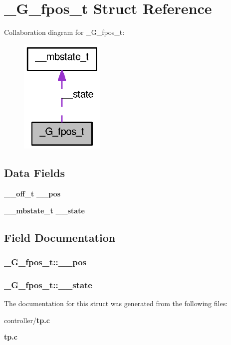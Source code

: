 \section{\_\-G\_\-fpos\_\-t Struct Reference}
\label{struct__G__fpos__t}


Collaboration diagram for \_\-G\_\-fpos\_\-t:
\nopagebreak
\begin{figure}[H]
\begin{center}
\leavevmode
\includegraphics[width=114pt]{struct__G__fpos__t__coll__graph}
\end{center}
\end{figure}
\subsection*{Data Fields}
\begin{DoxyCompactItemize}
\item 
{\bf \_\-\_\-off\_\-t} {\bf \_\-\_\-pos}
\item 
{\bf \_\-\_\-mbstate\_\-t} {\bf \_\-\_\-state}
\end{DoxyCompactItemize}


\subsection{Field Documentation}
\subsubsection[{\_\-\_\-pos}]{ {\bf \_\-G\_\-fpos\_\-t::\_\-\_\-pos}}\label{struct__G__fpos__t_a1f3f051dff02b13553766b90e703ac1a}
\subsubsection[{\_\-\_\-state}]{ {\bf \_\-G\_\-fpos\_\-t::\_\-\_\-state}}\label{struct__G__fpos__t_a7bedfe55beff20f064b4cefa4f65e81d}


The documentation for this struct was generated from the following files:\begin{DoxyCompactItemize}
\item 
controller/{\bf tp.c}\item 
{\bf tp.c}\end{DoxyCompactItemize}
